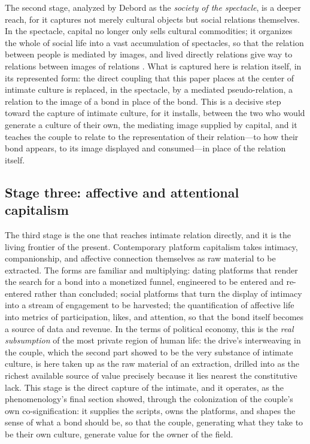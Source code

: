 The second stage, analyzed by Debord as the \emph{society of the spectacle}, is a deeper reach, for it captures not merely cultural objects but social relations themselves. In the spectacle, capital no longer only sells cultural commodities; it organizes the whole of social life into a vast accumulation of spectacles, so that the relation between people is mediated by images, and lived directly relations give way to relations between images of relations \parencite{debord1994}. What is captured here is relation itself, in its represented form: the direct coupling that this paper places at the center of intimate culture is replaced, in the spectacle, by a mediated pseudo-relation, a relation to the image of a bond in place of the bond. This is a decisive step toward the capture of intimate culture, for it installs, between the two who would generate a culture of their own, the mediating image supplied by capital, and it teaches the couple to relate to the representation of their relation---to how their bond appears, to its image displayed and consumed---in place of the relation itself.

\subsection*{Stage three: affective and attentional capitalism}

The third stage is the one that reaches intimate relation directly, and it is the living frontier of the present. Contemporary platform capitalism takes intimacy, companionship, and affective connection themselves as raw material to be extracted. The forms are familiar and multiplying: dating platforms that render the search for a bond into a monetized funnel, engineered to be entered and re-entered rather than concluded; social platforms that turn the display of intimacy into a stream of engagement to be harvested; the quantification of affective life into metrics of participation, likes, and attention, so that the bond itself becomes a source of data and revenue. In the terms of political economy, this is the \emph{real subsumption} of the most private region of human life: the drive's interweaving in the couple, which the second part showed to be the very substance of intimate culture, is here taken up as the raw material of an extraction, drilled into as the richest available source of value precisely because it lies nearest the constitutive lack. This stage is the direct capture of the intimate, and it operates, as the phenomenology's final section showed, through the colonization of the couple's own co-signification: it supplies the scripts, owns the platforms, and shapes the sense of what a bond should be, so that the couple, generating what they take to be their own culture, generate value for the owner of the field.

